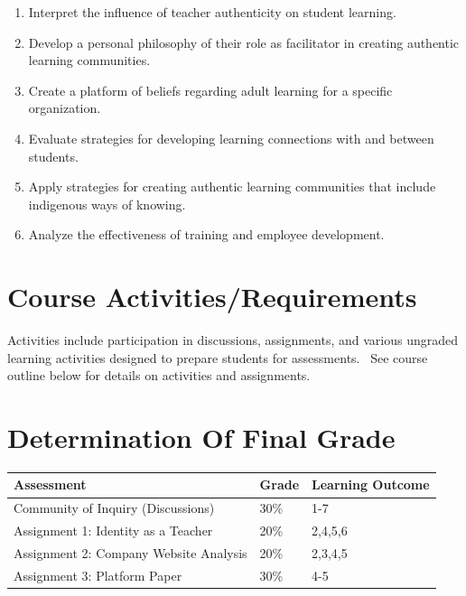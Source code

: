 \documentclass[
]{book}
\providecommand{\tightlist}{%
  \setlength{\itemsep}{0pt}\setlength{\parskip}{0pt}}
\begin{document}
\begin{enumerate}
\def\labelenumi{\arabic{enumi}.}
\tightlist
\item
  Interpret the influence of teacher authenticity on student learning.\\
\item
  Develop a personal philosophy of their role as facilitator in creating authentic learning communities.\\
\item
  Create a platform of beliefs regarding adult learning for a specific organization.\\
\item
  Evaluate strategies for developing learning connections with and between students.\\
\item
  Apply strategies for creating authentic learning communities that include indigenous ways of knowing.\\
\item
  Analyze the effectiveness of training and employee development.
\end{enumerate}

\hypertarget{course-activitiesrequirements}{%
\section*{Course Activities/Requirements}\label{course-activitiesrequirements}}

Activities include participation in discussions, assignments, and various ungraded learning activities designed to prepare students for assessments.~ See course outline below for details on activities and assignments.

\hypertarget{determination-of-final-grade}{%
\section*{Determination Of Final Grade}\label{determination-of-final-grade}}

\begin{longtable}[]{@{}lll@{}}
\toprule()
\textbf{Assessment} & \textbf{Grade} & Learning Outcome \\
\midrule()
\endhead
Community of Inquiry (Discussions) & 30\% & 1-7 \\
Assignment 1: Identity as a Teacher~ & 20\% & 2,4,5,6 \\
Assignment 2: Company Website Analysis & 20\% & 2,3,4,5 \\
Assignment 3: Platform Paper & 30\% & 4-5 \\
\bottomrule()
\end{longtable}
\end{document}
